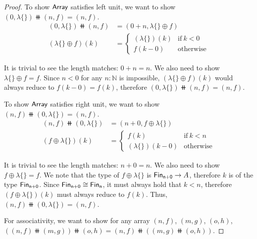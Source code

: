 \begin{proof}
    To show $\operatorname{\mathsf{Array}}$ satisfies left unit,
    we want to show $(0, \lambda\{\}) \doubleplus (n, f) = (n, f)$.
    \begin{align*}
        (0 , \lambda\{\}) \doubleplus (n , f) & = (0 + n , \lambda\{\} \oplus f)      \\
        (\lambda\{\} \oplus f)(k)             & = \begin{cases}
                                                      (\lambda\{\})(k) & \text{if}\ k < 0 \\
                                                      f(k - 0)         & \text{otherwise}
                                                  \end{cases}
    \end{align*}

    It is trivial to see the length matches: $0 + n = n$. We also need to show $\lambda\{\} \oplus f = f$.
    Since $n < 0$ for any $n : \mathbb{N}$ is impossible, $(\lambda\{\} \oplus f)(k)$ would always reduce to
    $f(k - 0) = f(k)$, therefore $(0, \lambda\{\}) \doubleplus (n, f) = (n, f)$.

    To show $\operatorname{\mathsf{Array}}$ satisfies right unit,
    we want to show $(n, f) \doubleplus (0, \lambda\{\}) = (n, f)$.
    \begin{align*}
        (n, f) \doubleplus (0 , \lambda\{\}) & = (n + 0, f \oplus \lambda\{\})           \\
        (f \oplus \lambda\{\})(k)            & = \begin{cases}
                                                     f(k)                 & \text{if}\ k < n \\
                                                     (\lambda\{\})(k - 0) & \text{otherwise}
                                                 \end{cases}
    \end{align*}

    It is trivial to see the length matches: $n + 0 = n$. We also need to show $f \oplus \lambda\{\} = f$.
    We note that the type of $f \oplus \lambda\{\}$ is $\Fin[n + 0] \to A$, therefore $k$ is of the type $\Fin[n + 0]$.
    Since $\Fin[n+0] \cong \Fin[n]$, it must always hold that $k < n$, therefore $(f \oplus \lambda\{\})(k)$ must
    always reduce to $f(k)$. Thus, $(n, f) \doubleplus (0, \lambda\{\}) = (n, f)$.

    For associativity, we want to show for any array $(n, f)$, $(m, g)$, $(o, h)$,
    $((n, f) \doubleplus (m, g)) \doubleplus (o, h) = (n, f) \doubleplus ((m, g) \doubleplus (o, h))$.


\end{proof}
